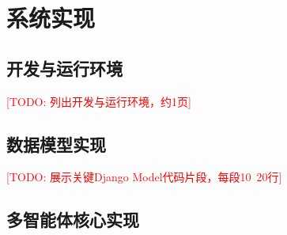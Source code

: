 \chapter{系统实现}

\section{开发与运行环境}

\textcolor{red}{[TODO: 列出开发与运行环境，约1页]}



\section{数据模型实现}

\textcolor{red}{[TODO: 展示关键Django Model代码片段，每段10~20行]}



\section{多智能体核心实现}

